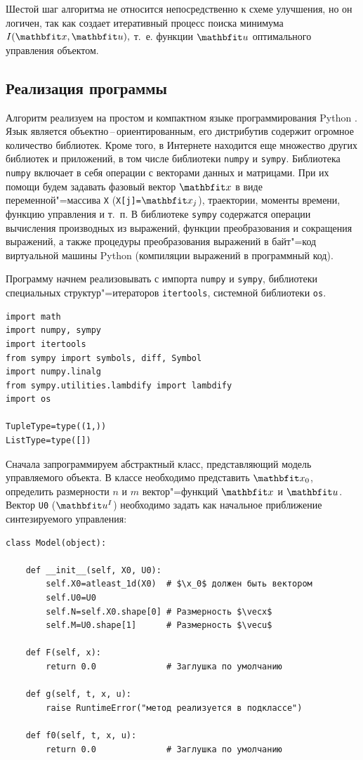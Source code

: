 \documentclass[a4paper,14pt, openany, twoside, final]{extbook} %
\begin{document}
Шестой шаг алгоритма не относится непосредственно к схеме улучшения, но он логичен, так как создает итеративный процесс поиска минимума $I(\x,\u),$ т.~е. функции $\vecu$ оптимального  управления объектом.

\subsection{Реализация программы}
\label{sec:improprog}

Алгоритм реализуем на простом и компактном языке программирования Python \cite{pythondoc,pythondl,pythonbook}.  Язык является объектно\,--\,ори\-ен\-ти\-ро\-ван\-ным, его дистрибутив содержит огромное количество библиотек.  Кроме того, в Интернете находится еще множество других библиотек и приложений, в том числе библиотеки \texttt{numpy} и \texttt{sympy}.  Библиотека \texttt{numpy} включает в себя операции с векторами данных и матрицами.  При их помощи будем задавать фазовый вектор $\vecx$ в виде переменной"=массива \texttt{X} (\texttt{X[j]=$\vecx_j$}), траектории, моменты времени, функцию управления и т.~п.  В библиотеке \texttt{sympy} содержатся операции вычисления производных из выражений, функции преобразования и сокращения выражений, а также процедуры преобразования выражений в байт"=код виртуальной машины Python (компиляции выражений в программный код).

Программу начнем реализовывать с импорта \texttt{numpy} и \texttt{sympy}, библиотеки специальных структур"=итераторов \texttt{itertools}, системной библиотеки \texttt{os}.
\begin{verbatim}
import math
import numpy, sympy
import itertools
from sympy import symbols, diff, Symbol
import numpy.linalg
from sympy.utilities.lambdify import lambdify
import os

TupleType=type((1,))
ListType=type([])
\end{verbatim}

Сначала запрограммируем абстрактный класс, представляющий модель управляемого объекта.  В классе необходимо представить $\x_0$, определить размерности $n$ и $m$ вектор"=функций $\x$ и $\u$.  Вектор \texttt{U0} ($\u^{I}$) необходимо задать как начальное приближение синтезируемого управления:

\begin{verbatim}
class Model(object):

    def __init__(self, X0, U0):
        self.X0=atleast_1d(X0)  # $\x_0$ должен быть вектором
        self.U0=U0
        self.N=self.X0.shape[0] # Размерность $\vecx$
        self.M=U0.shape[1]      # Размерность $\vecu$

    def F(self, x):
        return 0.0              # Заглушка по умолчанию

    def g(self, t, x, u):
        raise RuntimeError("метод реализуется в подклассе")

    def f0(self, t, x, u):
        return 0.0              # Заглушка по умолчанию
\end{verbatim}
\end{document}
